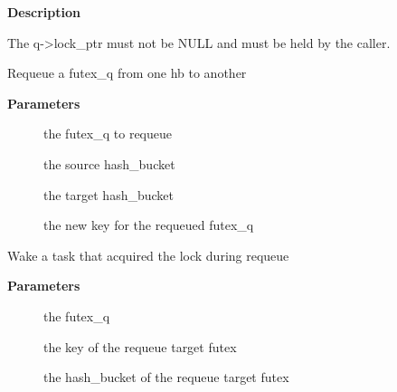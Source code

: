 \documentclass[a4paper,8pt,english]{sphinxmanual}
\begin{document}
\textbf{Description}

The q-\textgreater{}lock\_ptr must not be NULL and must be held by the caller.

\begin{fulllineitems}
\label{kernel-hacking/locking:c.requeue_futex}
Requeue a futex\_q from one hb to another

\end{fulllineitems}


\textbf{Parameters}
\begin{description}
\item[{}] \leavevmode
the futex\_q to requeue

\item[{}] \leavevmode
the source hash\_bucket

\item[{}] \leavevmode
the target hash\_bucket

\item[{}] \leavevmode
the new key for the requeued futex\_q

\end{description}

\begin{fulllineitems}
\label{kernel-hacking/locking:c.requeue_pi_wake_futex}
Wake a task that acquired the lock during requeue

\end{fulllineitems}


\textbf{Parameters}
\begin{description}
\item[{}] \leavevmode
the futex\_q

\item[{}] \leavevmode
the key of the requeue target futex

\item[{}] \leavevmode
the hash\_bucket of the requeue target futex

\end{description}
\end{document}
